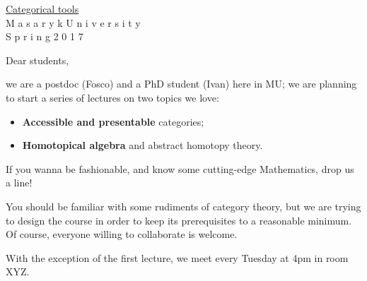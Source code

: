 \documentclass{article}
\def\titlefotn{\textsf}
\begin{document}
\begin{center}
\underline{\huge\titlefotn{Categorical tools}}\\[3em]
\Large \titlefotn {M a s a r y k \hspace{5pt} U n i v e r s i t y}\\
\titlefotn{S p r i n g \hspace{5pt} 2 0 1 7}
\end{center}

\vspace*{2em}
Dear students,

we are a postdoc (Fosco) and a PhD student (Ivan) here in MU; we are planning to start a series of lectures on two topics we love:
\begin{itemize}
	\item \textbf{Accessible and presentable} categories; 
	\item \textbf{Homotopical algebra} and abstract homotopy theory.
\end{itemize}

If you wanna be fashionable, and know some cutting-edge Mathematics, drop us a line!

You should be familiar with some rudiments of category theory, but we are trying to design the course in order to keep its prerequisites to a reasonable minimum. Of course, everyone willing to collaborate is welcome.

With the exception of the first lecture, we meet every Tuesday at 4pm in room XYZ.
\end{document}
